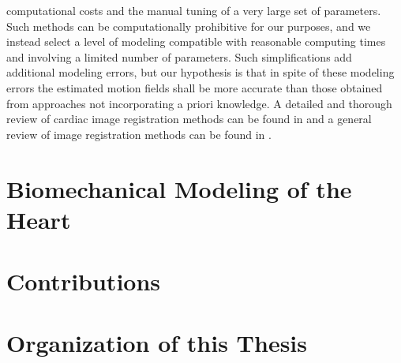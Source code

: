 computational costs and the manual tuning of a very large set of parameters. Such methods can be computationally prohibitive for our purposes, and we instead select a level of modeling compatible with reasonable computing times and involving a limited number of parameters. Such simplifications add additional modeling errors, but our hypothesis is that in spite of these modeling errors the estimated motion fields shall be more accurate than those obtained from approaches not incorporating a priori knowledge. A detailed and thorough review of cardiac image registration methods can be found in \cite{ makela02} and a general review of image registration methods can be found in \cite{ Zitova03}. 

\section{Biomechanical Modeling of the Heart}

\section{Contributions}

\section{Organization of this Thesis}